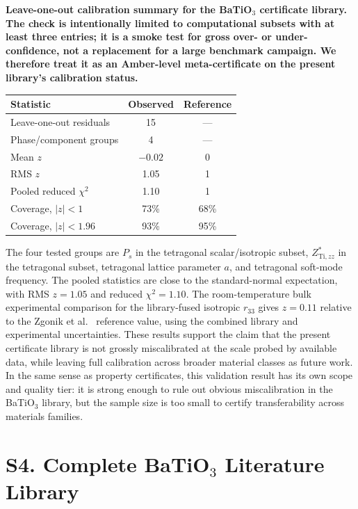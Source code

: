 ﻿\documentclass[prb,onecolumn,superscriptaddress,amsmath,amssymb,longbibliography]{revtex4-2}
\begin{document}
\begin{center}
\textbf{Leave-one-out calibration summary for the BaTiO$_3$ certificate
library. The check is intentionally limited to computational subsets with at
least three entries; it is a smoke test for gross over- or under-confidence,
not a replacement for a large benchmark campaign. We therefore treat it as an
Amber-level meta-certificate on the present library's calibration status.}\\[0.5em]
\begin{tabular}{lcc}
\toprule
Statistic & Observed & Reference \\
\midrule
Leave-one-out residuals & 15 & --- \\
Phase/component groups & 4 & --- \\
Mean $z$ & $-0.02$ & 0 \\
RMS $z$ & 1.05 & 1 \\
Pooled reduced $\chi^2$ & 1.10 & 1 \\
Coverage, $|z|<1$ & 73\% & 68\% \\
Coverage, $|z|<1.96$ & 93\% & 95\% \\
\bottomrule
\end{tabular}
\end{center}

The four tested groups are $P_s$ in the tetragonal scalar/isotropic subset,
$Z^*_{\mathrm{Ti},zz}$ in the tetragonal subset, tetragonal lattice parameter
$a$, and tetragonal soft-mode frequency. The pooled statistics are close to
the standard-normal expectation, with RMS $z=1.05$ and reduced
$\chi^2=1.10$. The room-temperature bulk experimental comparison for the
library-fused isotropic $r_{33}$ gives $z=0.11$ relative to the
Zgonik et al.\ \cite{Zgonik1994} reference value, using the combined library and experimental
uncertainties. These results support the claim that the present certificate
library is not grossly miscalibrated at the scale probed by available data,
while leaving full calibration across broader material classes as future work.
In the same sense as property certificates, this validation result has its own
scope and quality tier: it is strong enough to rule out obvious
miscalibration in the BaTiO$_3$ library, but the sample size is too small to
certify transferability across materials families.


\section{S4. Complete BaTiO$_3$ Literature Library}
\label{sec:si_library}
\end{document}
